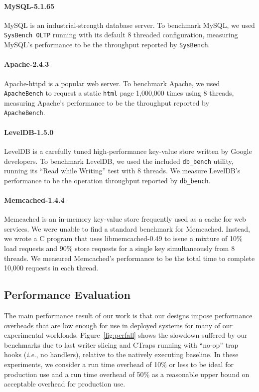 \documentclass[preprint,9pt]{sigplanconf}
\newcommand{\ctraps}{CTraps\xspace}
\begin{document}
\paragraph{MySQL-5.1.65} MySQL is an industrial-strength database
server. To benchmark MySQL, we used {\tt SysBench OLTP} running with its
default 8 threaded configuration, measuring MySQL's performance to be the
throughput reported by {\tt SysBench}.  

\paragraph{Apache-2.4.3} 
Apache-httpd is a popular web server.  To benchmark Apache, we used {\tt
ApacheBench} to request a static {\tt html} page 1,000,000 times using 8
threads, measuring Apache's performance to be the throughput reported by {\tt
ApacheBench}.  

\paragraph{LevelDB-1.5.0}
LevelDB is a carefully tuned high-performance key-value store written by Google
developers. To benchmark LevelDB, we used the included {\tt db\_bench} utility,
running its ``Read while Writing'' test with 8 threads.  We measure LevelDB's
performance to be the operation throughput reported by {\tt db\_bench}.

\paragraph{Memcached-1.4.4}
Memcached is an in-memory key-value store frequently used as a cache for web
services.  We were unable to find a standard benchmark for Memcached.  Instead,
we wrote a C program that uses libmemcached-0.49 to issue a
mixture of 10\% load requests and 90\% store requests for a single key 
simultaneously from 8 threads.  We measured Memcached's performance to be the
total time to complete 10,000 requests in each thread.



\subsection{Performance Evaluation}
\label{sec:eval:perf}

The main performance result of our work is that our designs impose performance
overheads that are low enough for use in deployed systems for many of our
experimental workloads.  Figure~\ref{fig:perfall} shows the slowdown suffered
by our benchmarks due to last writer slicing and \ctraps running with ``no-op''
trap hooks ({\em i.e.}, no handlers), relative to the natively executing
baseline.  In these experiments, we consider a run time overhead of 10\% or
less to be ideal for production use and a run time overhead of 50\% as
a reasonable upper bound on acceptable overhead for production use.
\end{document}
